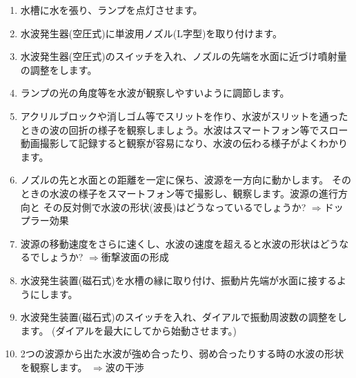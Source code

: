 \begin{enumerate}

\item 水槽に水を張り、ランプを点灯させます。

\item 水波発生器(空圧式)に単波用ノズル(L字型)を取り付けます。

\item 水波発生器(空圧式)のスイッチを入れ、ノズルの先端を水面に近づけ噴射量の調整をします。

\item ランプの光の角度等を水波が観察しやすいように調節します。

\item アクリルブロックや消しゴム等でスリットを作り、水波がスリットを通ったときの波の回折の様子を観察しましょう。水波はスマートフォン等でスロー動画撮影して記録すると観察が容易になり、水波の伝わる様子がよくわかります。

\item ノズルの先と水面との距離を一定に保ち、波源を一方向に動かします。
そのときの水波の様子をスマートフォン等で撮影し、観察します。波源の進行方向と
その反対側で水波の形状(波長)はどうなっているでしょうか? $\Rightarrow$ドップラー効果

\item 波源の移動速度をさらに速くし、水波の速度を超えると水波の形状はどうなるでしょうか? $\Rightarrow$衝撃波面の形成

\item 水波発生装置(磁石式)を水槽の縁に取り付け、振動片先端が水面に接するようにします。

\item 水波発生装置(磁石式)のスイッチを入れ、ダイアルで振動周波数の調整をします。
(ダイアルを最大にしてから始動させます。)

\item 2つの波源から出た水波が強め合ったり、弱め合ったりする時の水波の形状を観察します。 $\Rightarrow$波の干渉


\end{enumerate}



